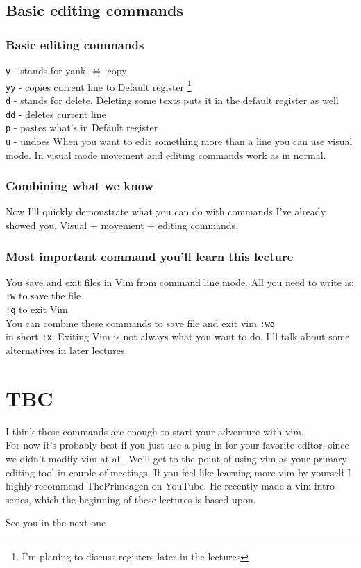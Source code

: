 \documentclass{beamer}
\begin{document}
    \subsection{Basic editing commands}
    \begin{frame}
    \frametitle{Basic editing commands}
        \texttt{y} - stands for yank $\Leftrightarrow$ copy\\
        \texttt{yy} - copies current line to Default register
        \footnote{I'm planing to discuss registers later in the lectures}\\
        \texttt{d} - stands for delete. Deleting some texts puts it in the default
        register as well\\
        \texttt{dd} - deletes current line\\
        \texttt{p} - pastes what's in Default register\\
        \texttt{u} - undoes
        When you want to edit something more than a line you can use visual mode. In
        visual mode movement and editing commands work as in normal.
    \end{frame}
    \begin{frame}
    \frametitle{Combining what we know}
    Now I'll quickly demonstrate what you can do with commands I've already showed you.
    Visual + movement + editing commands.
    \end{frame}
    \begin{frame}
    \frametitle{Most important command you'll learn this lecture}
    You save and exit files in Vim from command line mode. 
    All you need to write is:\\
    \texttt{:w} to save the file\\
    \texttt{:q} to exit Vim\\
    You can combine these commands to save file and exit vim \texttt{:wq} \\in short 
    \texttt{:x}. Exiting Vim is not always what you want to do. I'll talk about some 
    alternatives in later lectures.
    \end{frame}
    \section{TBC}
    \begin{frame}
    I think these commands are enough to start your adventure with vim.\\
    For now it's probably best if you just use a plug in for your favorite editor, 
    since we didn't modify vim at all. We'll get to the point of using vim as your 
    primary editing tool in couple of meetings. If you feel like learning more vim 
    by yourself I highly recommend ThePrimeagen on YouTube. He recently made a vim 
    intro series, which the beginning of these lectures is based upon.
    \end{frame}
    \begin{frame}
        \center
        See you in the next one
    \end{frame}
\end{document}
